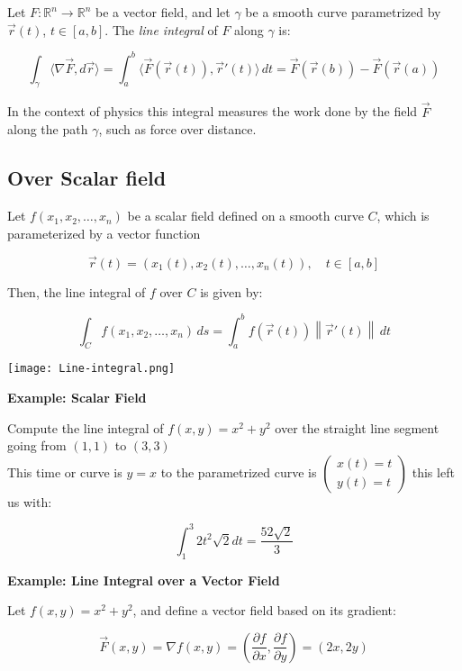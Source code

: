 Let \( F : \mathbb{R}^n \to \mathbb{R}^n \) be a vector field, and let \( \gamma \) be a smooth curve parametrized by \( \vec{r}(t) \), \( t \in [a, b] \). The \emph{line integral} of \( F \) 
along \( \gamma \) is:

\[
\int_\gamma \langle \nabla \vec{F}, d\vec{r} \rangle = \int_a^b \langle \vec{F}(\vec{r}(t)), \vec{r}'(t) \rangle \, dt = \vec{F}(\vec{r}(b)) - \vec{F}(\vec{r}(a))
\]


In the context of physics this integral measures the work done by the field \( \vec{F} \) along the path \( \gamma \), such as force over distance.

\subsection{Over Scalar field}

Let \( f(x_1, x_2, \ldots, x_n) \) be a scalar field defined on a smooth curve \( C \), which is parameterized by a vector function

\[
\vec{r}(t) = (x_1(t), x_2(t), \ldots, x_n(t)), \quad t \in [a, b]
\]

Then, the line integral of \( f \) over \( C \) is given by:

\[
\int_C f(x_1, x_2, \ldots, x_n) \, ds = \int_a^b f(\vec{r}(t)) \left\| \vec{r}'(t) \right\| \, dt
\]


\begin{center}
    \texttt{[image: Line-integral.png]}
\end{center}

\textbf{Example: Scalar Field}

Compute the line integral of \(f(x,y) = x^2 + y^2\) over the straight line segment going
from \((1,1)\) to \((3,3)\)
\\
This time or curve is \(y = x\) to the parametrized curve is \(\begin{pmatrix}
    x(t) = t \\ y(t) = t
\end{pmatrix}\) this left us with:

\[
\int_{1}^{3}  2t^2 \sqrt{2}dt = \frac{52\sqrt{2}}{3} 
\]

\textbf{Example: Line Integral over a Vector Field}

Let \( f(x, y) = x^2 + y^2 \), and define a vector field based on its gradient:

\[
\vec{F}(x, y) = \nabla f(x, y) = \left( \frac{\partial f}{\partial x}, \frac{\partial f}{\partial y} \right) = (2x, 2y)
\]

